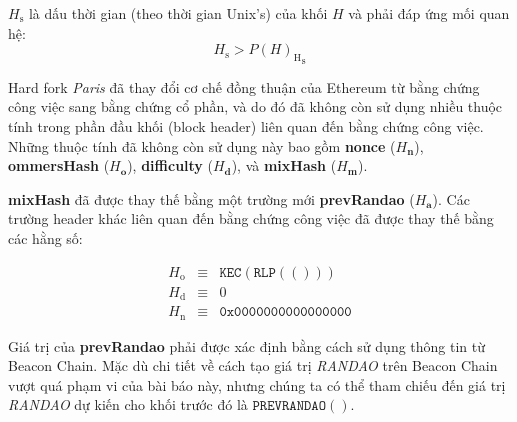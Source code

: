 \documentclass[9pt,oneside]{amsart}
\begin{document}
\begin{multicols}{2}
\hypertarget{block_timestamp_H__s}{}$H_{\mathrm{s}}$ là dấu thời gian (theo thời gian Unix's) của khối $H$ và phải đáp ứng mối quan hệ:
\begin{equation}
H_{\mathrm{s}} > {P(H)_{\mathrm{H}}}_{\mathrm{s}}
\end{equation}

Hard fork \textit{Paris} đã thay đổi cơ chế đồng thuận của Ethereum từ bằng chứng công việc sang bằng chứng cổ phần, và do đó đã không còn sử dụng nhiều thuộc tính trong phần đầu khối (block header) liên quan đến bằng chứng công việc. Những thuộc tính đã không còn sử dụng này bao gồm \textbf{nonce} ($H_{\mathbf{n}}$), \textbf{ommersHash} ($H_{\mathbf{o}}$), \textbf{difficulty} ($H_{\mathbf{d}}$), và \textbf{mixHash} ($H_{\mathbf{m}}$).

\textbf{mixHash} đã được thay thế bằng một trường mới \textbf{prevRandao} ($H_{\mathbf{a}}$). Các trường header khác liên quan đến bằng chứng công việc đã được thay thế bằng các hằng số:

\begin{eqnarray}
  H_{\mathrm{o}} & \equiv & \texttt{KEC}(\texttt{RLP}(())) \\
  H_{\mathrm{d}} & \equiv  & 0 \\
  H_{\mathrm{n}}  & \equiv & \texttt{0x0000000000000000}
\end{eqnarray}

Giá trị của \textbf{prevRandao} phải được xác định bằng cách sử dụng thông tin từ Beacon Chain. Mặc dù chi tiết về cách tạo giá trị \textit{RANDAO} trên Beacon Chain vượt quá phạm vi của bài báo này, nhưng chúng ta có thể tham chiếu đến giá trị \textit{RANDAO} dự kiến cho khối trước đó là $\mathtt{PREVRANDAO}()$.


\end{multicols}
\end{document}
